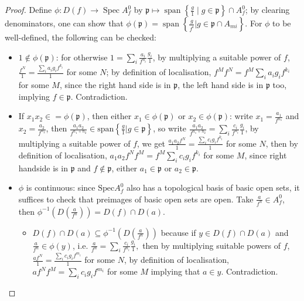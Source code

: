 \documentclass[a4paper,UKenglish,cleveref, autoref, thm-restate]{lipics-v2021}
\begin{document}
\begin{proof}
    Define $\phi: D(f) \to\operatorname{Spec}A^0_f$ by
    $\mathfrak{p}\mapsto\operatorname{span}\left\{\frac{g}1\mid g\in\mathfrak{p}\right\}\cap A^0_f$; by clearing denominators, one can show that $\phi(\mathfrak{p})=\operatorname{span}\left\{\frac g{f^i}|g\in \mathfrak p\cap A_{mi}\right\}$. For $\phi$ to be well-defined, the following can be checked:
    \begin{itemize}
        \item $1\not\in\phi(\mathfrak{p})$: for otherwise
        $1 = \sum_i\frac{a_i}{f^{n_i}}\frac {g_i}1$,
        by multiplying a suitable power of $f$,
        $\frac{f^N} 1 = \frac{\sum_i a_i g_i f^{k_i}}1$ for some $N$; by definition of localisation,  $f^M f^N=f^M \sum_i a_i g_i f^{k_i}$ for some $M$, since the right hand side is in $\mathfrak p$, the left hand side is in $\mathfrak p$ too, implying $f\in\mathfrak p$. Contradiction.
        \item If $x_1 x_2\in =\phi(\mathfrak p)$, then either $x_1\in\phi(\mathfrak p)$ or $x_2 \in \phi(\mathfrak p)$: write $x_1=\frac{a_1}{f^{n_1}}$ and $x_2=\frac{a_2}{f^{n_2}}$, then $\frac{a_1a_2}{f^{n_1+n_2}}\in\mathrm{span}\left\{\frac g1|g \in \mathfrak p\right\}$, so write
        $\frac{a_1a_2}{f^{n_1+n_2}}=\sum_i \frac{c_i}{f^{n_i}}\frac{g_i}1$,
        by multiplying a suitable power of $f$, we get
        $
        \frac{a_1a_2f^N}1=\frac{\sum_i c_ig_if^{k_i}}1
        $ for some $N$, then by definition of localisation, $a_1a_2f^N f^M=f^M\sum_i c_ig_if^{k_i}$ for some $M$, since right handside is in $\mathfrak p$ and $f\not\in\mathfrak p$, either $a_1\in\mathfrak p$ or $a_2\in\mathfrak p$.
        \item $\phi$ is continuous: since $\mathrm{Spec}A^0_f$ also has a topological basis of basic open sets, it suffices to check that preimages of basic open sets are open. Take $\frac{a}{f^n}\in A^0_f$, then $\phi^{-1}\left(D\left(\frac a{f^n}\right)\right)=D(f)\cap D(a)$. 
        \begin{itemize}
            \item $D(f)\cap D(a)\subseteq \phi^{-1}\left(D\left(\frac a{f^n}\right)\right)$ because if $y\in D(f)\cap D(a)$ and $\frac a{f^n}\in \phi(y)$, i.e.
            $
            \frac a{f^n}=\sum_i \frac{c_i}{f^{n_i}}\frac{g_i}1,
            $
            then by multiplying suitable powers of $f$,
            $
            \frac{a f^N}1=\frac{\sum_i c_ig_if^{m_i}}1
            $ for some $N$, by definition of localisation, $af^N f^M=\sum_i c_i g_i f^{m_i}$ for some $M$ implying that $a\in y$. Contradiction.

\end{itemize}
\end{itemize}
\end{proof}
\end{document}
